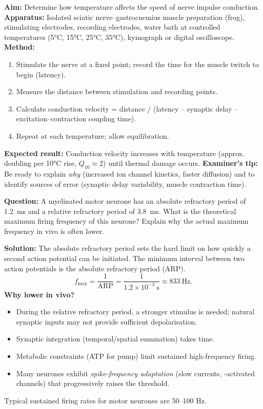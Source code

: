 \documentclass[11pt]{article}
\begin{document}
\begin{experience}
\textbf{Aim:} Determine how temperature affects the speed of nerve impulse conduction.
\textbf{Apparatus:} Isolated sciatic nerve–gastrocnemius muscle preparation (frog), stimulating electrodes, recording electrodes, water bath at controlled temperatures (5°C, 15°C, 25°C, 35°C), kymograph or digital oscilloscope.
\textbf{Method:}
\begin{enumerate}
\item Stimulate the nerve at a fixed point; record the time for the muscle twitch to begin (latency).
\item Measure the distance between stimulation and recording points.
\item Calculate conduction velocity = distance / (latency – synaptic delay – excitation–contraction coupling time).
\item Repeat at each temperature; allow equilibration.
\end{enumerate}
\textbf{Expected result:} Conduction velocity increases with temperature (approx. doubling per 10°C rise, $Q_{10} \approx 2$) until thermal damage occurs.
\textbf{Examiner's tip:} Be ready to explain \emph{why} (increased ion channel kinetics, faster diffusion) and to identify sources of error (synaptic delay variability, muscle contraction time).
\end{experience}

\begin{exoresolu}
\textbf{Question:} A myelinated motor neurone has an absolute refractory period of \SI{1.2}{ms} and a relative refractory period of \SI{3.8}{ms}. What is the theoretical maximum firing frequency of this neurone? Explain why the actual maximum frequency in vivo is often lower.

\textbf{Solution:}
The absolute refractory period sets the hard limit on how quickly a second action potential can be initiated. The minimum interval between two action potentials is the absolute refractory period (ARP).
\[
f_{\text{max}} = \frac{1}{\text{ARP}} = \frac{1}{1.2 \times 10^{-3}\ \mathrm{s}} \approx 833\ \mathrm{Hz}.
\]
\textbf{Why lower in vivo?}
\begin{itemize}
\item During the relative refractory period, a stronger stimulus is needed; natural synaptic inputs may not provide sufficient depolarisation.
\item Synaptic integration (temporal/spatial summation) takes time.
\item Metabolic constraints (ATP for  pump) limit sustained high-frequency firing.
\item Many neurones exhibit \emph{spike-frequency adaptation} (slow  currents, -activated  channels) that progressively raises the threshold.
\end{itemize}
Typical sustained firing rates for motor neurones are 50–100 Hz.
\end{exoresolu}
\end{document}
